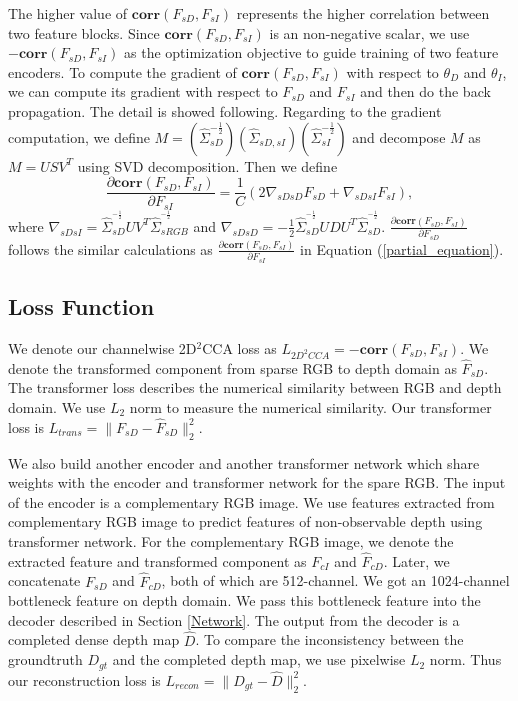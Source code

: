 \documentclass{article}
\begin{document}
The higher value of $\mathbf{corr(\mathit{{F}_{sD}},\mathit{{F}_{sI}})}$ represents the higher correlation between two feature blocks. Since $\mathbf{corr(\mathit{{F}_{sD}},\mathit{{F}_{sI}})}$ is an non-negative scalar, we use $\mathbf{-corr(\mathit{{F}_{sD}},\mathit{{F}_{sI}})}$ as the optimization objective to guide training of two feature encoders. 
To compute the gradient of $\mathbf{corr(\mathit{{F}_{sD}},\mathit{{F}_{sI}})}$ with
respect to $\theta_{D}$ and $\theta_{I}$, we can compute its gradient with respect to $\mathit{F_{sD}}$ and $\mathit{F_{sI}}$ and then do the back propagation. The detail is showed following. Regarding to the gradient computation, we define
$\mathit{M}=(\hat{\Sigma}_{sD}^{-\frac{1}{2}}) (\hat{\Sigma}_{sD,sI})(\hat{\Sigma}_{sI}^{-\frac{1}{2}})$
and decompose $\mathit{M}$ as $\mathit{M} = \mathit{USV^{T}}$ using SVD decomposition. Then we define
\begin{equation}
    \frac{\partial \mathbf{corr(\mathit{{F}_{sD}},\mathit{{F}_{sI}})}}{\partial \mathit{{F}_{sI}}}=\frac{1}{C}\left ( 2\nabla_{sDsD}F_{sD}+\nabla_{sDsI}F_{sI} \right ),
\label{partial_equation}
\end{equation}
where $\nabla_{sDsI} = \hat{\Sigma}_{sD}^{^{-\frac{1}{2}}}UV^{T}\hat{\Sigma}_{sRGB}^{^{-\frac{1}{2}}}$ and $\nabla_{sDsD} = -\frac{1}{2}\hat{\Sigma}_{sD}^{^{-\frac{1}{2}}}UDU^{T}\hat{\Sigma}_{sD}^{^{-\frac{1}{2}}}$. $ \frac{\partial \mathbf{corr(\mathit{{F}_{sD}},\mathit{{F}_{sI}})}}{\partial \mathit{{F}_{sD}}}$ follows the similar calculations as $ \frac{\partial \mathbf{corr(\mathit{{F}_{sD}},\mathit{{F}_{sI}})}}{\partial \mathit{{F}_{sI}}}$ in Equation (\ref{partial_equation}). 

\subsection{Loss Function}
We denote our channelwise 2D$^2$CCA loss as $L_{2D^2CCA} = \mathbf{-corr(\mathit{{F}_{sD}},\mathit{{F}_{sI}})}$. We denote the transformed component from sparse RGB to depth domain as $\hat{F}_{sD}$. The transformer loss describes the numerical similarity between RGB and depth domain. We use $L_2$ norm to measure the numerical similarity. Our transformer loss is $L_{trans} = \| {F}_{sD} - \hat{F}_{sD}\| _2^2$.

We also build another encoder and another transformer network which share weights with the encoder and transformer network for the spare RGB. The input of the encoder is a complementary RGB image. We use features extracted from complementary RGB image to predict features of non-observable depth using transformer network. For the complementary RGB image, we denote the extracted feature and transformed component as $\mathit{F}_{cI}$ and $\hat{F}_{cD}$. Later, we concatenate $\mathit{F}_{sD}$ and $\hat{F}_{cD}$, both of which are 512-channel. We got an 1024-channel bottleneck feature on depth domain. We pass this bottleneck feature into the decoder described in Section \ref{Network}. The output from the decoder is a completed dense depth map $\hat{D}$. To compare the inconsistency between the groundtruth $D_{gt}$ and the completed depth map, we use pixelwise $L_2$ norm. Thus our reconstruction loss is $L_{recon} = \| D_{gt}-\hat{D}\| ^2_2$.
\end{document}
